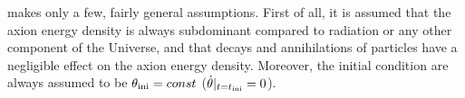 \documentclass[11pt,a4paper]{article}
\begin{document}
\mimes makes only a few, fairly general assumptions. First of all, it is assumed that the axion energy density is always subdominant compared to radiation or any other component of the Universe, and that decays and annihilations of particles have a negligible effect on the axion energy density. Moreover, the initial condition are always assumed to be $\theta_{\rm ini}{} = const$ (\ie $\dot \theta|_{t=t_{\rm ini}{}}=0$).





\newpage
 {}
                         
\end{document}
